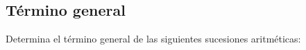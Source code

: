 \documentclass[12pt,addpoints]{evalua}
\begin{document}
\begin{questions}
      \begin{multicols}{2}
      \end{multicols}
      
	\subsection*{Término general}
    
      \question[4] Determina el término general de las siguientes sucesiones aritméticas:
   
      \begin{multicols}{2}
            \begin{parts}

\end{parts}
\end{multicols}
\end{questions}
\end{document}
